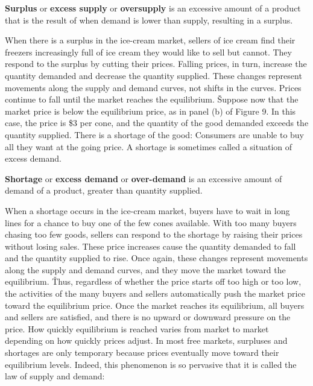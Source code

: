\textbf{Surplus} or \textbf{excess supply} or \textbf{oversupply} is an excessive amount of a product that is the
result of when demand is lower than supply, resulting in a surplus.
\ed

When there is a surplus in the ice-cream market, sellers of ice cream find their freezers increasingly full of ice
cream they would like to sell but cannot. They respond to the surplus by cutting their prices. Falling prices, in
turn, increase the quantity demanded and decrease the quantity supplied. These changes represent movements along the
supply and demand curves, not shifts in the curves. Prices continue to fall until the market reaches the equilibrium. \v

Suppose now that the market price is below the equilibrium price, as in panel (b) of Figure 9. In this case, the
price is \$3 per cone, and the quantity of the good demanded exceeds the quantity supplied. There is a shortage of
the good: Consumers are unable to buy all they want at the going price. A shortage is sometimes called a situation of
excess demand.

\textbf{Shortage} or \textbf{excess demand} or \textbf{over-demand} is an excessive amount of demand of a product,
greater than quantity supplied.
\ed

When a shortage occurs in the ice-cream market, buyers have to wait in long lines for a chance to buy one of the few
cones available. With too many buyers chasing too few goods, sellers can respond to the shortage by raising their
prices without losing sales. These price increases cause the quantity demanded to fall and the quantity supplied to
rise. Once again, these changes represent movements along the supply and demand curves, and they move the market
toward the equilibrium. \v

Thus, regardless of whether the price starts off too high or too low, the activities of the many buyers and sellers
automatically push the market price toward the equilibrium price. Once the market reaches its equilibrium, all buyers
and sellers are satisfied, and there is no upward or downward pressure on the price. How quickly equilibrium is
reached varies from market to market depending on how quickly prices adjust. In most free markets, surpluses and
shortages are only temporary because prices eventually move toward their equilibrium levels. Indeed, this phenomenon
is so pervasive that it is called the law of supply and demand:

